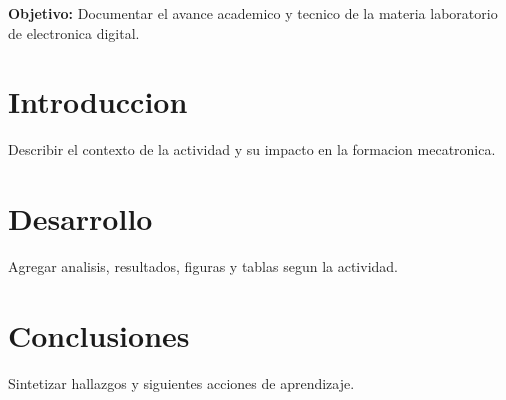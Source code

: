 \documentclass[spanish,letterpaper,oneside]{article}
\begin{document}
\templatePortrait
\templatePagecfg
\onehalfspacing

\begin{abstractd}
\textbf{Objetivo:} Documentar el avance academico y tecnico de la materia laboratorio de electronica digital.
\end{abstractd}

\templateIndex
\templateFinalcfg

\section{Introduccion}
Describir el contexto de la actividad y su impacto en la formacion mecatronica.

\section{Desarrollo}
Agregar analisis, resultados, figuras y tablas segun la actividad.

\section{Conclusiones}
Sintetizar hallazgos y siguientes acciones de aprendizaje.



\end{document}
